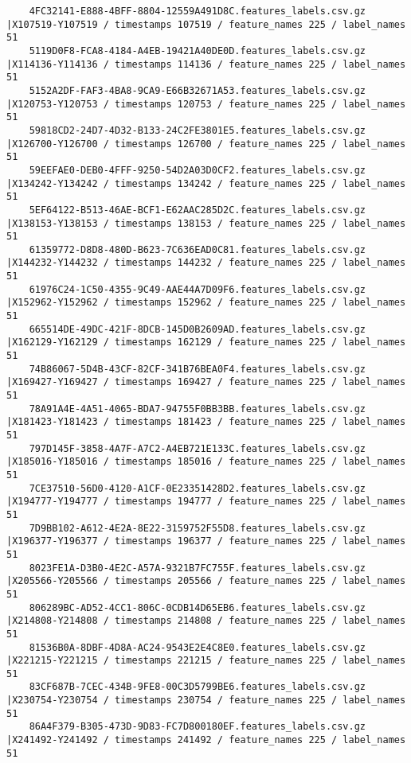 \documentclass{UoNMCHA}
\numberwithin{equation}{section}
\begin{document}
\begin{lstlisting}
    4FC32141-E888-4BFF-8804-12559A491D8C.features_labels.csv.gz |X107519-Y107519 / timestamps 107519 / feature_names 225 / label_names 51
    5119D0F8-FCA8-4184-A4EB-19421A40DE0D.features_labels.csv.gz |X114136-Y114136 / timestamps 114136 / feature_names 225 / label_names 51
    5152A2DF-FAF3-4BA8-9CA9-E66B32671A53.features_labels.csv.gz |X120753-Y120753 / timestamps 120753 / feature_names 225 / label_names 51
    59818CD2-24D7-4D32-B133-24C2FE3801E5.features_labels.csv.gz |X126700-Y126700 / timestamps 126700 / feature_names 225 / label_names 51
    59EEFAE0-DEB0-4FFF-9250-54D2A03D0CF2.features_labels.csv.gz |X134242-Y134242 / timestamps 134242 / feature_names 225 / label_names 51
    5EF64122-B513-46AE-BCF1-E62AAC285D2C.features_labels.csv.gz |X138153-Y138153 / timestamps 138153 / feature_names 225 / label_names 51
    61359772-D8D8-480D-B623-7C636EAD0C81.features_labels.csv.gz |X144232-Y144232 / timestamps 144232 / feature_names 225 / label_names 51
    61976C24-1C50-4355-9C49-AAE44A7D09F6.features_labels.csv.gz |X152962-Y152962 / timestamps 152962 / feature_names 225 / label_names 51
    665514DE-49DC-421F-8DCB-145D0B2609AD.features_labels.csv.gz |X162129-Y162129 / timestamps 162129 / feature_names 225 / label_names 51
    74B86067-5D4B-43CF-82CF-341B76BEA0F4.features_labels.csv.gz |X169427-Y169427 / timestamps 169427 / feature_names 225 / label_names 51
    78A91A4E-4A51-4065-BDA7-94755F0BB3BB.features_labels.csv.gz |X181423-Y181423 / timestamps 181423 / feature_names 225 / label_names 51
    797D145F-3858-4A7F-A7C2-A4EB721E133C.features_labels.csv.gz |X185016-Y185016 / timestamps 185016 / feature_names 225 / label_names 51
    7CE37510-56D0-4120-A1CF-0E23351428D2.features_labels.csv.gz |X194777-Y194777 / timestamps 194777 / feature_names 225 / label_names 51
    7D9BB102-A612-4E2A-8E22-3159752F55D8.features_labels.csv.gz |X196377-Y196377 / timestamps 196377 / feature_names 225 / label_names 51
    8023FE1A-D3B0-4E2C-A57A-9321B7FC755F.features_labels.csv.gz |X205566-Y205566 / timestamps 205566 / feature_names 225 / label_names 51
    806289BC-AD52-4CC1-806C-0CDB14D65EB6.features_labels.csv.gz |X214808-Y214808 / timestamps 214808 / feature_names 225 / label_names 51
    81536B0A-8DBF-4D8A-AC24-9543E2E4C8E0.features_labels.csv.gz |X221215-Y221215 / timestamps 221215 / feature_names 225 / label_names 51
    83CF687B-7CEC-434B-9FE8-00C3D5799BE6.features_labels.csv.gz |X230754-Y230754 / timestamps 230754 / feature_names 225 / label_names 51
    86A4F379-B305-473D-9D83-FC7D800180EF.features_labels.csv.gz |X241492-Y241492 / timestamps 241492 / feature_names 225 / label_names 51

\end{lstlisting}
\end{document}
